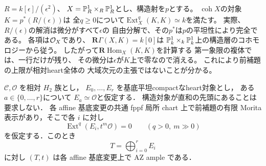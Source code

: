 \begin{example}[特異基底上の相対heartのExt次元]
\label{ex:qa-singular-base-heart-ext-unbounded}
$R=k[\epsilon]/(\epsilon^2)$、
$X=\mathbb P^1_R\times_R\mathbb P^1_R$とし、構造射を$p$とする。
$\operatorname{coh}X$の対象$K=p^*(R/(\epsilon))$は
全$q\geq0$について$\operatorname{Ext}_X^q(K,K)\simeq k$を満たす。
実際、$R/(\epsilon)$の解消は微分がすべて$\epsilon$の
自由分解で、その$p^*$は$p$の平坦性により完全である。
各項は$\mathcal O_X$であり、
$\mathbf R\Gamma(X,K)=k[0]$は
$\mathbb P^1_k\times_k\mathbb P^1_k$上の構造層のコホモロジーから従う。
したがって$\mathbf R\operatorname{Hom}_X(K,K)$を計算する
第一象限の複体では、一行だけが残り、
その微分は$\epsilon$が$K$上で零なので消える。
これにより前補題の上限が相対heart全体の
大域次元の主張ではないことが分かる。
\end{example}

\begin{proposition}[有限個の平坦対象を加えた相対AZ生成]
\label{prop:qa-relative-flat-foundation-az}
$\mathcal C,\mathcal O$ を相対 $H_2$ 族とし，
$E_0,\ldots,E_r$ を基底平坦compactなheart対象とし，
ある$a\in\{0,\ldots,r\}$について
$E_a\simeq\mathcal O$と仮定する．
構造対象が直和の先頭にあることは要求しない．
各 affine 基底変更の共通 fppf 局所 chart 上で前補題の有限 Morita
表示があり，そこで各 $i$ に対し
\[
 \operatorname{Ext}^q(E_i,t^m\mathcal O)=0
 \qquad(q>0,\ m\gg0)
 \tag{FO}\label{eq:qa-flat-foundation-forward-o}
\]
を仮定する．このとき
\[
 T=\bigoplus_{i=0}^r E_i
\]
に対し $(T,t)$ は各 affine 基底変更上で AZ ample である．
\end{proposition}
